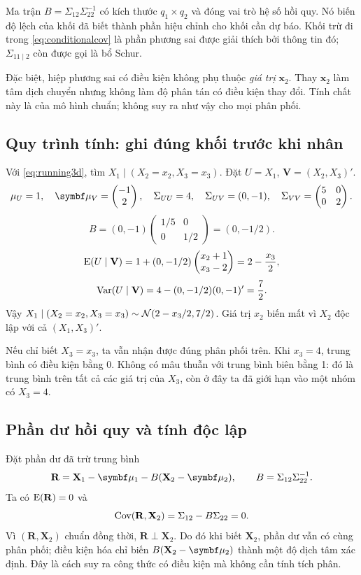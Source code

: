 Ma trận $B=\Sigma_{12}\Sigma_{22}^{-1}$ có kích thước $q_1\times q_2$
và đóng vai trò hệ số hồi quy. Nó biến độ lệch của khối đã biết thành phần
hiệu chỉnh cho khối cần dự báo.
Khối trừ đi trong \eqref{eq:conditionalcov} là phần phương sai được giải
thích bởi thông tin đó; $\Sigma_{11\mid2}$ còn được gọi là bổ Schur.

Đặc biệt, hiệp phương sai có điều kiện không phụ thuộc \emph{giá trị}
$\mathbf x_2$. Thay $\mathbf x_2$ làm tâm dịch chuyển nhưng không làm
độ phân tán có điều kiện thay đổi. Tính chất này là của mô hình chuẩn;
không suy ra như vậy cho mọi phân phối.

\subsection{Quy trình tính: ghi đúng khối trước khi nhân}
\begin{example}
Với \eqref{eq:running3d}, tìm $X_1\mid(X_2=x_2,X_3=x_3)$.
Đặt $U=X_1$, $\mathbf V=(X_2,X_3)'$.
\[
 \mu_U=1,\quad\vmu_V=\begin{pmatrix}-1\\2\end{pmatrix},\quad
 \Sigma_{UU}=4,\quad\Sigma_{UV}=(0,-1),\quad
 \Sigma_{VV}=\begin{pmatrix}5&0\\0&2\end{pmatrix}.
\]
\[
 B=(0,-1)\begin{pmatrix}1/5&0\\0&1/2\end{pmatrix}=(0,-1/2).
\]
\[
 \operatorname{E}(U\mid\mathbf V)=1+(0,-1/2)
 \begin{pmatrix}x_2+1\\x_3-2\end{pmatrix}=2-\frac{x_3}{2},
\]
\[
 \operatorname{Var}(U\mid\mathbf V)=4-(0,-1/2)(0,-1)'=\frac72.
\]
Vậy $X_1\mid(X_2=x_2,X_3=x_3)\sim\mathcal N(2-x_3/2,7/2)$.
Giá trị $x_2$ biến mất vì $X_2$ độc lập với cả $(X_1,X_3)'$.
\end{example}

Nếu chỉ biết $X_3=x_3$, ta vẫn nhận được đúng phân phối trên. Khi
$x_3=4$, trung bình có điều kiện bằng 0. Không có mâu thuẫn với trung bình
biên bằng 1: đó là trung bình trên tất cả các giá trị của $X_3$, còn ở đây
ta đã giới hạn vào một nhóm có $X_3=4$.

\subsection{Phần dư hồi quy và tính độc lập}
Đặt phần dư đã trừ trung bình
\[
 \mathbf R=\mathbf X_1-\vmu_1-B(\mathbf X_2-\vmu_2),
 \qquad B=\Sigma_{12}\Sigma_{22}^{-1}.
\]
Ta có $\operatorname{E}(\mathbf R)=0$ và
\[
 \operatorname{Cov}(\mathbf R,\mathbf X_2)=\Sigma_{12}-B\Sigma_{22}=0.
\]
Vì $(\mathbf R,\mathbf X_2)$ chuẩn đồng thời, $\mathbf R\perp\mathbf X_2$.
Do đó khi biết $\mathbf X_2$, phần dư vẫn có cùng phân phối; điều kiện hóa
chỉ biến $B(\mathbf X_2-\vmu_2)$ thành một độ dịch tâm xác định.
Đây là cách suy ra công thức có điều kiện mà không cần tính tích phân.

